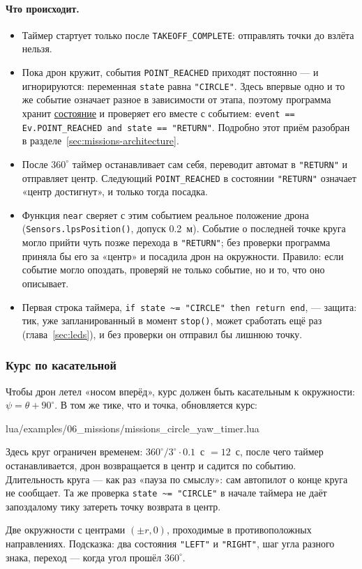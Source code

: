 \paragraph{Что происходит.}
\begin{itemize}
    \item Таймер стартует только после \verb|TAKEOFF_COMPLETE|: отправлять точки до взлёта нельзя.
    \item Пока дрон кружит, события \verb|POINT_REACHED| приходят постоянно --- и игнорируются: переменная \verb|state| равна \verb|"CIRCLE"|. Здесь впервые одно и то же событие означает разное в зависимости от этапа, поэтому программа хранит \hyperlink{term:state}{состояние} и проверяет его вместе с событием: \verb|event == Ev.POINT_REACHED and state == "RETURN"|. Подробно этот приём разобран в разделе~\ref{sec:missions-architecture}.
    \item После $360^\circ$ таймер останавливает сам себя, переводит автомат в \verb|"RETURN"| и отправляет центр. Следующий \verb|POINT_REACHED| в состоянии \verb|"RETURN"| означает «центр достигнут», и только тогда посадка.
    \item Функция \verb|near| сверяет с этим событием реальное положение дрона (\verb|Sensors.lpsPosition()|, допуск 0.2~м). Событие о последней точке круга могло прийти чуть позже перехода в \verb|"RETURN"|; без проверки программа приняла бы его за «центр» и посадила дрон на окружности. Правило: если событие могло опоздать, проверяй не только событие, но и то, что оно описывает.
    \item Первая строка таймера, \verb|if state ~= "CIRCLE" then return end|, --- защита: тик, уже запланированный в момент \verb|stop()|, может сработать ещё раз (глава~\ref{sec:leds}), и без проверки он отправил бы лишнюю точку.
\end{itemize}

\subsubsection*{Курс по касательной}

Чтобы дрон летел «носом вперёд», курс должен быть касательным к окружности: $\psi = \theta + 90^\circ$. В том же тике, что и точка, обновляется курс:

\begin{codefile}{lua/examples/06_missions/missions_circle_yaw_timer.lua}
\end{codefile}

Здесь круг ограничен временем: $360^\circ / 3^\circ \cdot 0.1$~с $= 12$~с, после чего таймер останавливается, дрон возвращается в центр и садится по событию. Длительность круга --- как раз «пауза по смыслу»: сам автопилот о конце круга не сообщает. Та же проверка \verb|state ~= "CIRCLE"| в начале таймера не даёт запоздалому тику затереть точку возврата в центр.

\begin{taskbox}[Восьмёрка]
Две окружности с центрами $(\pm r, 0)$, проходимые в противоположных направлениях. Подсказка: два состояния \verb|"LEFT"| и \verb|"RIGHT"|, шаг угла разного знака, переход --- когда угол прошёл $360^\circ$.
\end{taskbox}
